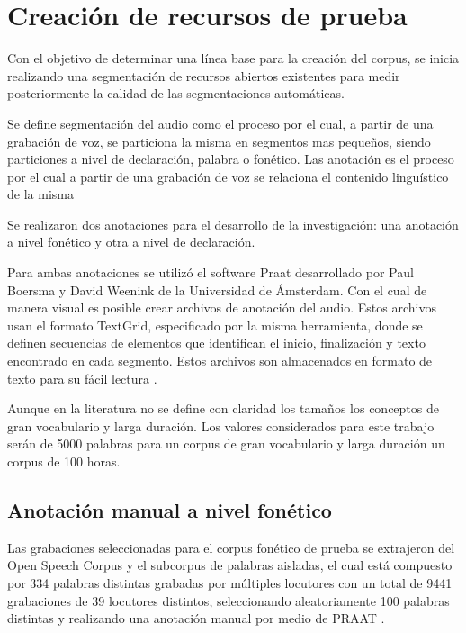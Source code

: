 \chapter{Creación de recursos de prueba}

Con el objetivo de determinar una línea base para la creación del corpus, se inicia realizando una segmentación de recursos abiertos existentes para medir posteriormente la calidad de las segmentaciones automáticas.

Se define segmentación del audio como el proceso por el cual, a partir de una grabación de voz, se particiona la misma en segmentos mas pequeños, siendo particiones a nivel de declaración, palabra o fonético. Las anotación es el proceso por el cual a partir de una grabación de voz se relaciona el contenido linguístico de la misma

Se realizaron dos anotaciones para el desarrollo de la investigación: una anotación a nivel fonético y otra a nivel de declaración.

Para ambas anotaciones se utilizó el software Praat \cite{Praat} desarrollado por Paul Boersma y David Weenink de la Universidad de Ámsterdam. Con el cual de manera visual es posible crear archivos de anotación del audio. Estos archivos usan el formato TextGrid, especificado por la misma herramienta, donde se definen secuencias de elementos que identifican el inicio, finalización y texto encontrado en cada segmento. Estos archivos son almacenados en formato de texto para su fácil lectura \cite{TextGrids}.

Aunque en la literatura no se define con claridad los tamaños los conceptos de gran vocabulario y larga duración. Los valores considerados para este trabajo serán de 5000 palabras para un corpus de gran vocabulario y larga duración un corpus de 100 horas.

\section{Anotación manual a nivel fonético}



Las grabaciones seleccionadas para el corpus fonético de prueba se extrajeron del Open Speech Corpus \cite{Collazos2015} y el subcorpus de palabras aisladas, el cual está compuesto por 334 palabras distintas grabadas por múltiples locutores con un total de 9441 grabaciones de 39 locutores distintos, seleccionando aleatoriamente 100 palabras distintas y realizando una anotación manual por medio de PRAAT \cite{Praat}.

